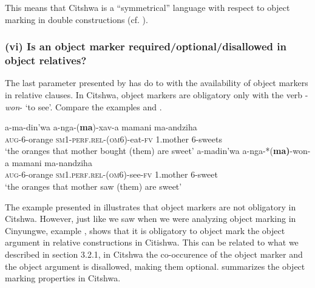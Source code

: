 \documentclass[output=paper]{langscibook}
\begin{document}
This means that Citshwa is a ``symmetrical'' language with respect to object marking in double constructions (cf. \citealt{BresnanMoshi1990}).

\subsubsection{(vi) Is an object marker required/optional/disallowed in object 
 relatives?}

The last parameter presented by \citet{MartenKula2012} has do to with the availability of object markers in relative clauses. In Citshwa, object markers are obligatory only with the verb -\textit{won}{}- ‘to see’. Compare the examples  and .    

\ea\label{ex:ngunga:39} \gll a-ma-din’wa   a-nga-(\textbf{ma})-xav-a     mamani  ma-andziha\\
{\textsc{aug}}{}-6-orange  {\textsc{sm1}-\textsc{perf}.\textsc{rel}-(\textsc{om}6}){}-eat-{\textsc{fv}}    1.mother  6-sweets   \\
\glt ‘the oranges that mother bought (them) are sweet’
\ex\label{ex:ngunga:40} \gll  a-madin’wa  a-nga-*(\textbf{ma)}{}-won-a  mamani  ma-nandziha  \\
{\textsc{aug}}{}-6-orange  {\textsc{sm1}.\textsc{perf}.\textsc{rel}-(}\textsc{om}6){}-see-{\textsc{fv}}  1.mother  6-sweet  \\
\glt ‘the oranges that mother saw (them) are sweet’
\z


The example presented in  illustrates that object markers are not obligatory in Citshwa. However, just like we saw when we were analyzing object marking in Cinyungwe, example , shows that it is obligatory to object mark the object argument in relative constructions in Citishwa. This can be related to what we described in section 3.2.1, in Citshwa the co-occurence of the object marker and the object argument is disallowed, making them optional.  summarizes the object marking properties in Citshwa. 
\end{document}

